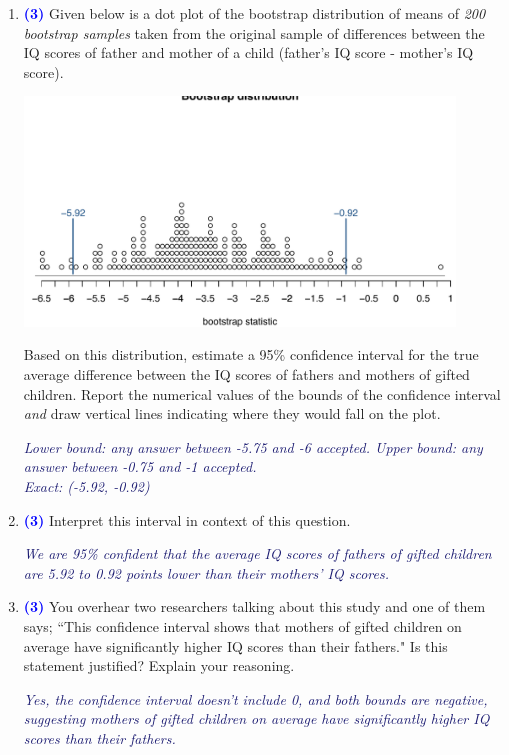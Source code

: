 \documentclass[11pt]{article}
\newcommand{\soln}[1]{\textcolor{MidnightBlue}{\textit{#1}}}	%
\newcommand{\pts}[1]{ \textbf{{\footnotesize \textcolor{blue}{(#1)}}} }	%
\begin{document}
\begin{enumerate}
\begin{enumerate}
\item \pts{3} Given below is a dot plot of the bootstrap distribution of means of \emph{200 bootstrap samples} taken from the original sample of differences between the IQ scores of father and mother of a child (father's IQ score - mother's IQ score).
\begin{center}
\includegraphics[width=0.9\textwidth]{figures/gifted/iqdiff_boot_soln}
\end{center}
Based on this distribution, estimate a 95\% confidence interval for the true average difference between the IQ scores of fathers and mothers of gifted children. Report the numerical values of the bounds of the confidence interval \emph{and} draw vertical lines indicating where they would fall on the plot.


\soln{Lower bound: any answer between -5.75 and -6 accepted. Upper bound: any answer between -0.75 and -1 accepted.\\
Exact: (-5.92, -0.92)}

\item \pts{3} Interpret this interval in context of this question. 

\soln{We are 95\% confident that the average IQ scores of fathers of gifted children are 5.92 to 0.92 points lower than their mothers' IQ scores.}

\vfill
\pagebreak

%

\item \pts{3} You overhear two researchers talking about this study and one of them says; ``This confidence interval shows that mothers of gifted children on average have significantly higher IQ scores than their fathers." Is this statement justified? Explain your reasoning.

\soln{Yes, the confidence interval doesn't include 0, and both bounds are negative, suggesting mothers of gifted children on average have significantly higher IQ scores than their fathers.}
$\:$\\
$\:$\\


\end{enumerate}
\end{enumerate}
\end{document}

